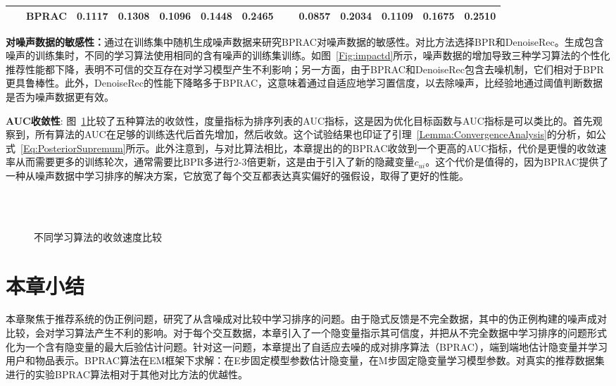 \begin{table*}[!]
{\begin{tabular}{llccccccccccc}
			~& \textbf{BPRAC} & \textbf{0.1117} & \textbf{0.1308} & \textbf{0.1096} & \textbf{0.1448} &\textbf{0.2465}&~  & \textbf{0.0857} &\textbf{0.2034} & \textbf{0.1109} & \textbf{0.1675} & \textbf{0.2510} \\
			\bottomrule[1.2pt]
		\end{tabular}
	}
\end{table*}
\begin{figure*}[!]
	\centering
	\caption{不同噪声率对学习算法性能的影响}
	\label{Fig:impactd}
\end{figure*}

\textbf{对噪声数据的敏感性：}通过在训练集中随机生成噪声数据来研究\textsf{BPRAC}对噪声数据的敏感性。对比方法选择\textsf{BPR}和\textsf{DenoiseRec}。生成包含噪声的训练集时，不同的学习算法使用相同的含有噪声的训练集训练。如图~\ref{Fig:impactd}所示，噪声数据的增加导致三种学习算法的个性化推荐性能都下降，表明不可信的交互存在对学习模型产生不利影响；另一方面，由于\textsf{BPRAC}和\textsf{DenoiseRec}包含去噪机制，它们相对于\textsf{BPR}更具鲁棒性。此外，\textsf{DenoiseRec}的性能下降略多于\textsf{BPRAC}，这意味着通过自适应地学习置信度，以去除噪声，比经验地通过阈值判断数据是否为噪声数据更有效。

\par
\textbf{AUC收敛性}: 图~\ref{Fig:Covergence}比较了五种算法的收敛性，度量指标为排序列表的AUC指标，这是因为优化目标函数与AUC指标是可以类比的\cite{Steffen:2009:UAI}。首先观察到，所有算法的AUC在足够的训练迭代后首先增加，然后收敛。这个试验结果也印证了引理~\ref{Lemma:ConvergenceAnalysis}的分析，如公式~\eqref{Eq:PosteriorSupremum}所示。此外注意到，与对比算法相比，本章提出的的\textsf{BPRAC}收敛到一个更高的AUC指标，代价是更慢的收敛速率从而需要更多的训练轮次，通常需要比BPR多进行2-3倍更新，这是由于引入了新的隐藏变量$c_{ui}$。这个代价是值得的，因为BPRAC提供了一种从噪声数据中学习排序的解决方案，它放宽了每个交互都表达真实偏好的强假设，取得了更好的性能。
\begin{figure}[!]
	\centering
	\\
	\\
	\caption{不同学习算法的收敛速度比较}
	\label{Fig:Covergence}
\end{figure}

\section{本章小结}
本章聚焦于推荐系统的伪正例问题，研究了从含噪成对比较中学习排序的问题。由于隐式反馈是不完全数据，其中的伪正例构建的噪声成对比较，会对学习算法产生不利的影响。对于每个交互数据，本章引入了一个隐变量指示其可信度，并把从不完全数据中学习排序的问题形式化为一个含有隐变量的最大后验估计问题。针对这一问题，本章提出了自适应去噪的成对排序算法（BPRAC），端到端地估计隐变量并学习用户和物品表示。BPRAC算法在EM框架下求解：在E步固定模型参数估计隐变量，在M步固定隐变量学习模型参数。对真实的推荐数据集进行的实验BPRAC算法相对于其他对比方法的优越性。

